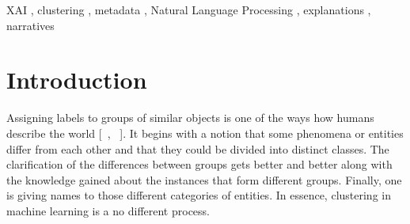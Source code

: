 \documentclass[
 twocolumn,
 hf,
]{ceurart}
\begin{document}
\begin{keywords}
  XAI \sep
  clustering \sep
  metadata \sep
  Natural Language Processing \sep
  explanations \sep
  narratives
\end{keywords}

\maketitle

\section{Introduction}\label{sec:introduction}
Assigning labels to groups of similar objects is one of the ways how humans describe the world [~\cite{Rosch1978-ROSCAC-5}, ~\cite{doi:10.1146/annurev.neuro.051508.135546}].
It begins with a notion that some phenomena or entities differ from each other and that they could be divided into distinct classes.
The clarification of the differences between groups gets better and better along with the knowledge gained about the instances that form different groups.
Finally, one is giving names to those different categories of entities. %
In essence, clustering in machine learning is a no different process.
\end{document}
